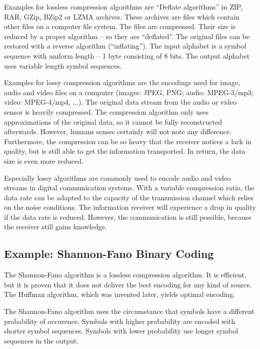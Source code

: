 \begin{refsection}
Examples for lossless compression algorithms are ``Deflate algorithms'' in ZIP, RAR, GZip, BZip2 or LZMA archives. These archives are files which contain other files on a computer file system. The files are compressed. Their size is reduced by a proper algorithm -- so they are ``deflated''. The original files can be restored with a reverse algorithm (``inflating''). The input alphabet is a symbol sequence with uniform length -- 1 byte consisting of 8 bits. The output alphabet uses variable length symbol sequences.

Examples for lossy compression algorithms are the encodings used for image, audio and video files on a computer (images: JPEG, PNG; audio: MPEG-3/mp3; video: MPEG-4/mp4, ...). The original data stream from the audio or video sensor is heavily compressed. The compression algorithm only uses approximations of the original data, so it cannot be fully reconstructed afterwards. However, humans senses certainly will not note any difference. Furthermore, the compression can be so heavy that the receiver notices a lack in quality, but is still able to get the information transported. In return, the data size is even more reduced.

Especially lossy algorithms are commonly used to encode audio and video streams in digital communication systems. With a variable compression ratio, the data rate can be adapted to the capacity of the transmission channel which relies on the noise conditions. The information receiver will experience a drop in quality if the data rate is reduced. However, the communication is still possible, because the receiver still gains knowledge.

\subsection{Example: Shannon-Fano Binary Coding}

The  Shannon-Fano algorithm is a lossless compression algorithm. It is efficient, but it is proven that it does not deliver the best encoding for any kind of source. The Huffman algorithm, which was invented later, yields optimal encoding.

The Shannon-Fano algorithm uses the circumstance that symbols have a different probability of occurence. Symbols with higher probability are encoded with shorter symbol sequences. Symbols with lower probability use longer symbol sequences in the output.


\end{refsection}

